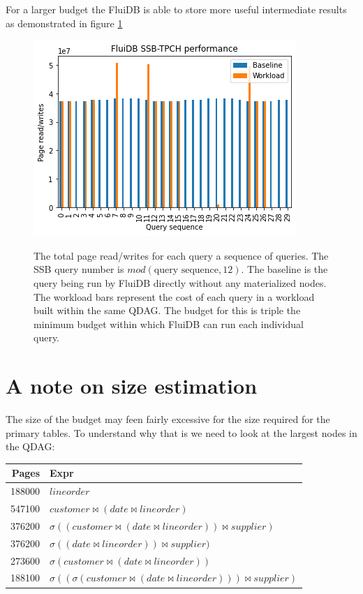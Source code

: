 For a larger budget the FluiDB is able to store more useful
intermediate results as demonstrated in figure \ref{fig:large_budget_plot}

\begin{figure}[p]
\centering
\includegraphics[width=.9\linewidth]{./imgs/2021-12-03_20-12-36_screenshot.png}
\label{fig:large_budget_plot}
\caption{The total page read/writes for each query a sequence of
  queries. The SSB query number is \(mod(\text{query
    sequence},12)\). The baseline is the query being run by FluiDB
  directly without any materialized nodes. The workload bars represent
  the cost of each query in a workload built within the same QDAG. The
  budget for this is triple the minimum budget within which FluiDB can
  run each individual query.}
\end{figure}

\section{A note on size estimation}

The size of the budget may feen fairly excessive for the size required
for the primary tables. To understand why that is we need to look at
the largest nodes in the QDAG:

\begin{center}
\begin{tabular}{rl}
Pages & Expr\\
\hline
188000 & \(lineorder\)\\
547100 & \(customer \Join (date \Join lineorder)\)\\
376200 & \(\sigma ((customer \Join (date \Join lineorder)) \Join supplier)\)\\
376200 & \(\sigma ((date \Join lineorder)) \Join supplier)\)\\
273600 & \(\sigma (customer \Join (date \Join lineorder))\)\\
188100 & \(\sigma ((\sigma (customer \Join (date \Join lineorder))) \Join supplier)\)\\
\end{tabular}
\end{center}

